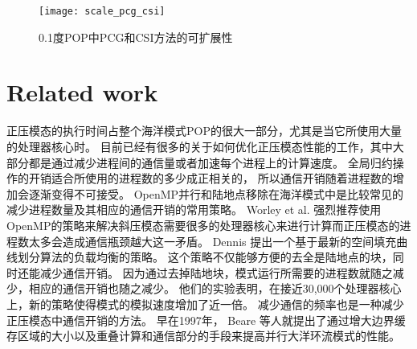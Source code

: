 \begin {figure}
\vspace{-10pt}
\centering
\begin{minipage}{360pt}
\texttt{[image: scale\_pcg\_csi]}
\end{minipage}
\vspace{-10pt}
\caption []{ 0.1度POP中PCG和CSI方法的可扩展性 \label {fig:scale}}
\vspace{-10pt}
\end {figure}


\section{Related work} \label{se:rel}
 
正压模态的执行时间占整个海洋模式POP的很大一部分，尤其是当它所使用大量的处理器核心时。
目前已经有很多的关于如何优化正压模态性能的工作，其中大部分都是通过减少进程间的通信量或者加速每个进程上的计算速度。 
全局归约操作的开销适合所使用的进程数的多少成正相关的， 所以通信开销随着进程数的增加会逐渐变得不可接受。
OpenMP并行和陆地点移除在海洋模式中是比较常见的减少进程数量及其相应的通信开销的常用策略。 
Worley et al. \cite{Worley:2011:PCE:2063384.2063457} 强烈推荐使用OpenMP的策略来解决斜压模态需要很多的处理器核心来进行计算而正压模态的进程数太多会造成通信瓶颈越大这一矛盾。 
Dennis \cite{dennis2007inverse,dennis2008scaling}提出一个基于最新的空间填充曲线划分算法的负载均衡的策略。 
这个策略不仅能够方便的去全是陆地点的块，同时还能减少通信开销。 因为通过去掉陆地块，模式运行所需要的进程数就随之减少，相应的通信开销也随之减少。 
他们的实验表明，在接近30,000个处理器核心上，新的策略使得模式的模拟速度增加了近一倍。 
减少通信的频率也是一种减少正压模态中通信开销的方法。 
早在1997年， Beare \cite{beare1997optimisation}等人就提出了通过增大边界缓存区域的大小以及重叠计算和通信部分的手段来提高并行大洋环流模式的性能。 



